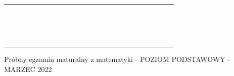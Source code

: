 \documentclass[10pt]{article}
\begin{document}
\begin{center}
\begin{tabular}{|c|c|c|c|c|c|c|c|c|c|c|c|c|c|c|c|c|c|c|c|c|c|c|c|}
\hline
 &  &  &  &  &  &  &  &  &  &  &  &  &  &  &  &  &  &  &  &  &  &  &  \\
\hline
 &  &  &  &  &  &  &  &  &  &  &  &  &  &  &  &  &  &  &  &  &  &  &  \\
\hline
 &  &  &  &  &  &  &  &  &  &  &  &  &  &  &  &  &  &  &  &  &  &  &  \\
\hline
 &  &  &  &  &  &  &  &  &  &  &  &  &  &  &  &  &  &  &  &  &  &  &  \\
\hline
 &  &  &  &  &  &  &  &  &  &  &  &  &  &  &  &  &  &  &  &  &  &  &  \\
\hline
 &  &  &  &  &  &  &  &  &  &  &  &  &  &  &  &  &  &  &  &  &  &  &  \\
\hline
 &  &  &  &  &  &  &  &  &  &  &  &  &  &  &  &  &  &  &  &  &  &  &  \\
\hline
 &  &  &  &  &  &  &  &  &  &  &  &  &  &  &  &  &  &  &  &  &  &  &  \\
\hline
 &  &  &  &  &  &  &  &  &  &  &  &  &  &  &  &  &  &  &  &  &  &  &  \\
\hline
 &  &  &  &  &  &  &  &  &  &  &  &  &  &  &  &  &  &  &  &  &  &  &  \\
\hline
 &  &  &  &  &  &  &  &  &  &  &  &  &  &  &  &  &  &  &  &  &  &  &  \\
\hline
 &  &  &  &  &  &  &  &  &  &  &  &  &  &  &  &  &  &  &  &  &  &  &  \\
\hline
 &  &  &  &  &  &  &  &  &  &  &  &  &  &  &  &  &  &  &  &  &  &  &  \\
\hline
 &  &  &  &  &  &  &  &  &  &  &  &  &  &  &  &  &  &  &  &  &  &  &  \\
\hline
 &  &  &  &  &  &  &  &  &  &  &  &  &  &  &  &  &  &  &  &  &  &  &  \\
\hline
 &  &  &  &  &  &  &  &  &  &  &  &  &  &  &  &  &  &  &  &  &  &  &  \\
\hline
 &  &  &  &  &  &  &  &  &  &  &  &  &  &  &  &  &  &  &  &  &  &  &  \\
\hline
\end{tabular}
\end{center}

Próbny egzamin maturalny z matematyki - POZIOM PODSTAWOWY - MARZEC 2022
\end{document}
